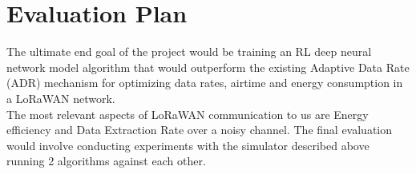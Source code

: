 \chapter{Evaluation Plan}

The ultimate end goal of the project would be training an RL deep neural network model algorithm that would outperform the existing Adaptive Data Rate (ADR) mechanism for optimizing data rates, airtime and energy consumption in a LoRaWAN network.\\

The most relevant aspects of LoRaWAN communication to us are Energy efficiency and Data Extraction Rate over a noisy channel. The final evaluation would involve conducting experiments with the simulator described above running 2 algorithms against each other.

